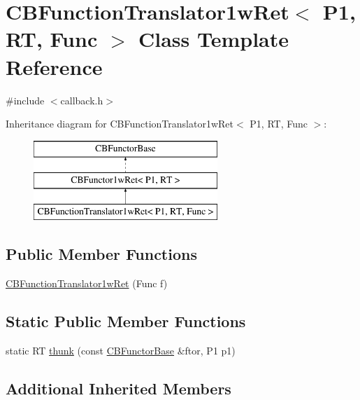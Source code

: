 \hypertarget{class_c_b_function_translator1w_ret}{\section{C\+B\+Function\+Translator1w\+Ret$<$ P1, R\+T, Func $>$ Class Template Reference}
\label{class_c_b_function_translator1w_ret}
}


{\ttfamily \#include $<$callback.\+h$>$}

Inheritance diagram for C\+B\+Function\+Translator1w\+Ret$<$ P1, R\+T, Func $>$\+:\begin{figure}[H]
\begin{center}
\leavevmode
\includegraphics[height=3.000000cm]{class_c_b_function_translator1w_ret}
\end{center}
\end{figure}
\subsection*{Public Member Functions}
\begin{DoxyCompactItemize}
\item 
\hyperlink{class_c_b_function_translator1w_ret_aed1a0b2082a3dae5dfeaf467f2cf20dd}{C\+B\+Function\+Translator1w\+Ret} (Func f)
\end{DoxyCompactItemize}
\subsection*{Static Public Member Functions}
\begin{DoxyCompactItemize}
\item 
static R\+T \hyperlink{class_c_b_function_translator1w_ret_a8a5d692b29dd3c76b1ea623c2e3c62a7}{thunk} (const \hyperlink{class_c_b_functor_base}{C\+B\+Functor\+Base} \&ftor, P1 p1)
\end{DoxyCompactItemize}
\subsection*{Additional Inherited Members}


